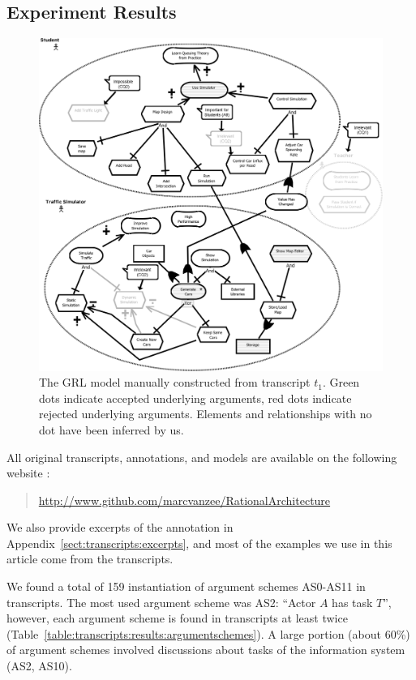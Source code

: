 \subsection{Experiment Results}

\begin{figure}[h!]
\includegraphics[width=\textwidth]{img/Fig6}
\caption{The GRL model manually constructed from transcript $t_1$. Green dots indicate accepted underlying arguments, red dots indicate rejected underlying arguments. Elements and relationships with no dot have been inferred by us.} %
\label{fig:transcripts:grl}
\end{figure} 

All original transcripts, annotations, and models are available on the following website :
\begin{quote} \url{http://www.github.com/marcvanzee/RationalArchitecture}
\end{quote}
We also provide excerpts of the annotation in Appendix~\ref{sect:transcripts:excerpts}, and most of the examples we use in this article come from the transcripts.

We found a total of 159 instantiation of argument schemes AS0-AS11 in transcripts. The most used argument scheme was AS2: ``Actor $A$ has task $T$'', however, each argument scheme is found in transcripts at least twice (Table~\ref{table:transcripts:results:argumentschemes}). A large portion (about 60\%) of argument schemes involved discussions about tasks of the information system (AS2, AS10).

